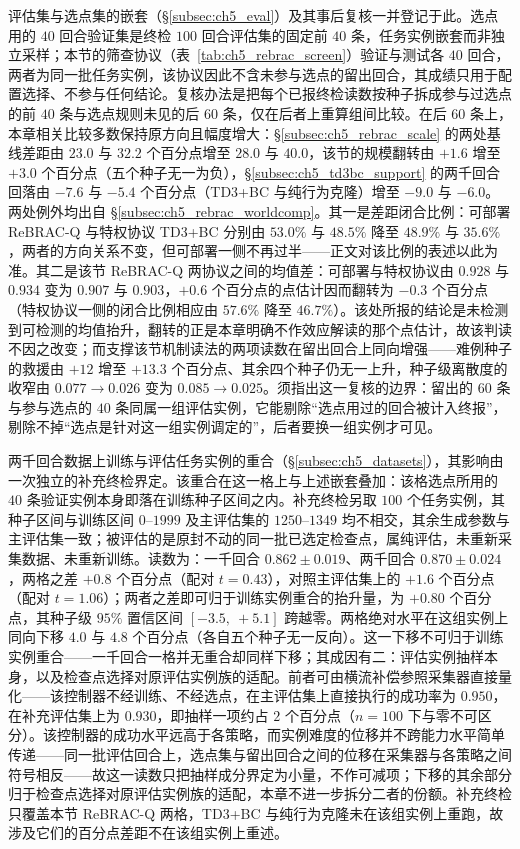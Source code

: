评估集与选点集的嵌套（\S\ref{subsec:ch5_eval}）及其事后复核一并登记于此。选点用的 $40$ 回合验证集是终检 $100$ 回合评估集的固定前 $40$ 条，任务实例嵌套而非独立采样；本节的筛查协议（表~\ref{tab:ch5_rebrac_screen}）验证与测试各 $40$ 回合，两者为同一批任务实例，该协议因此不含未参与选点的留出回合，其成绩只用于配置选择、不参与任何结论。复核办法是把每个已报终检读数按种子拆成参与过选点的前 $40$ 条与选点规则未见的后 $60$ 条，仅在后者上重算组间比较。在后 $60$ 条上，本章相关比较多数保持原方向且幅度增大：\S\ref{subsec:ch5_rebrac_scale} 的两处基线差距由 $23.0$ 与 $32.2$ 个百分点增至 $28.0$ 与 $40.0$，该节的规模翻转由 $+1.6$ 增至 $+3.0$ 个百分点（五个种子无一为负），\S\ref{subsec:ch5_td3bc_support} 的两千回合回落由 $-7.6$ 与 $-5.4$ 个百分点（TD3+BC 与纯行为克隆）增至 $-9.0$ 与 $-6.0$。两处例外均出自 \S\ref{subsec:ch5_rebrac_worldcomp}。其一是差距闭合比例：可部署 ReBRAC-Q 与特权协议 TD3+BC 分别由 $53.0\%$ 与 $48.5\%$ 降至 $48.9\%$ 与 $35.6\%$，两者的方向关系不变，但可部署一侧不再过半——正文对该比例的表述以此为准。其二是该节 ReBRAC-Q 两协议之间的均值差：可部署与特权协议由 $0.928$ 与 $0.934$ 变为 $0.907$ 与 $0.903$，$+0.6$ 个百分点的点估计因而翻转为 $-0.3$ 个百分点（特权协议一侧的闭合比例相应由 $57.6\%$ 降至 $46.7\%$）。该处所报的结论是未检测到可检测的均值抬升，翻转的正是本章明确不作效应解读的那个点估计，故该判读不因之改变；而支撑该节机制读法的两项读数在留出回合上同向增强——难例种子的救援由 $+12$ 增至 $+13.3$ 个百分点、其余四个种子仍无一上升，种子级离散度的收窄由 $0.077 \to 0.026$ 变为 $0.085 \to 0.025$。须指出这一复核的边界：留出的 $60$ 条与参与选点的 $40$ 条同属一组评估实例，它能剔除“选点用过的回合被计入终报”，剔除不掉“选点是针对这一组实例调定的”，后者要换一组实例才可见。

两千回合数据上训练与评估任务实例的重合（\S\ref{subsec:ch5_datasets}），其影响由一次独立的补充终检界定。该重合在这一格上与上述嵌套叠加：该格选点所用的 $40$ 条验证实例本身即落在训练种子区间之内。补充终检另取 $100$ 个任务实例，其种子区间与训练区间 $0$–$1999$ 及主评估集的 $1250$–$1349$ 均不相交，其余生成参数与主评估集一致；被评估的是原封不动的同一批已选定检查点，属纯评估，未重新采集数据、未重新训练。读数为：一千回合 $0.862 \pm 0.019$、两千回合 $0.870 \pm 0.024$，两格之差 $+0.8$ 个百分点（配对 $t = 0.43$），对照主评估集上的 $+1.6$ 个百分点（配对 $t = 1.06$）；两者之差即可归于训练实例重合的抬升量，为 $+0.80$ 个百分点，其种子级 $95\%$ 置信区间 $[-3.5,\ +5.1]$ 跨越零。两格绝对水平在这组实例上同向下移 $4.0$ 与 $4.8$ 个百分点（各自五个种子无一反向）。这一下移不可归于训练实例重合——一千回合一格并无重合却同样下移；其成因有二：评估实例抽样本身，以及检查点选择对原评估实例族的适配。前者可由横流补偿参照采集器直接量化——该控制器不经训练、不经选点，在主评估集上直接执行的成功率为 $0.950$，在补充评估集上为 $0.930$，即抽样一项约占 $2$ 个百分点（$n=100$ 下与零不可区分）。该控制器的成功水平远高于各策略，而实例难度的位移并不跨能力水平简单传递——同一批评估回合上，选点集与留出回合之间的位移在采集器与各策略之间符号相反——故这一读数只把抽样成分界定为小量，不作可减项；下移的其余部分归于检查点选择对原评估实例族的适配，本章不进一步拆分二者的份额。补充终检只覆盖本节 ReBRAC-Q 两格，TD3+BC 与纯行为克隆未在该组实例上重跑，故涉及它们的百分点差距不在该组实例上重述。

